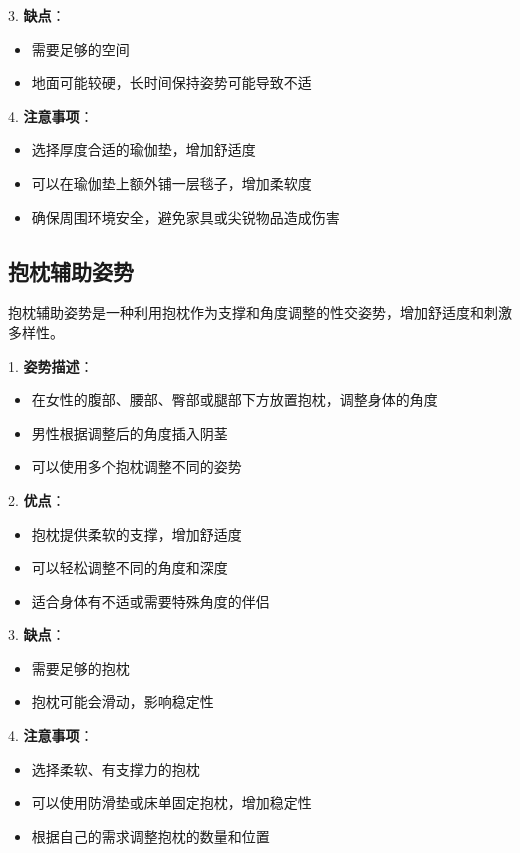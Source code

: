 \documentclass[12pt,UTF8]{ctexbook}
\begin{document}
3. \textbf{缺点}：
  \begin{itemize}
  \item 需要足够的空间
  \item 地面可能较硬，长时间保持姿势可能导致不适
  \end{itemize}

4. \textbf{注意事项}：
  \begin{itemize}
  \item 选择厚度合适的瑜伽垫，增加舒适度
  \item 可以在瑜伽垫上额外铺一层毯子，增加柔软度
  \item 确保周围环境安全，避免家具或尖锐物品造成伤害
  \end{itemize}

\subsection{抱枕辅助姿势}

抱枕辅助姿势是一种利用抱枕作为支撑和角度调整的性交姿势，增加舒适度和刺激多样性。

1. \textbf{姿势描述}：
  \begin{itemize}
  \item 在女性的腹部、腰部、臀部或腿部下方放置抱枕，调整身体的角度
  \item 男性根据调整后的角度插入阴茎
  \item 可以使用多个抱枕调整不同的姿势
  \end{itemize}

2. \textbf{优点}：
  \begin{itemize}
  \item 抱枕提供柔软的支撑，增加舒适度
  \item 可以轻松调整不同的角度和深度
  \item 适合身体有不适或需要特殊角度的伴侣
  \end{itemize}

3. \textbf{缺点}：
  \begin{itemize}
  \item 需要足够的抱枕
  \item 抱枕可能会滑动，影响稳定性
  \end{itemize}

4. \textbf{注意事项}：
  \begin{itemize}
  \item 选择柔软、有支撑力的抱枕
  \item 可以使用防滑垫或床单固定抱枕，增加稳定性
  \item 根据自己的需求调整抱枕的数量和位置
  \end{itemize}
\end{document}

